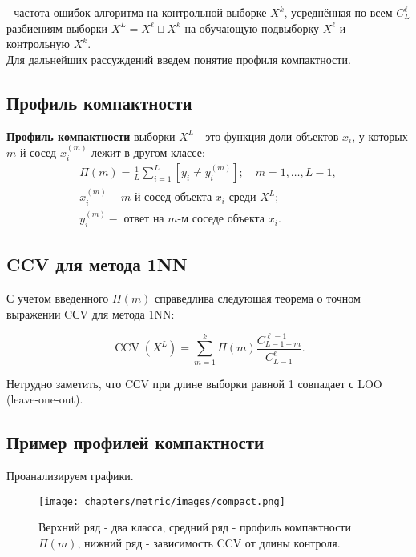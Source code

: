 \noindent
- частота ошибок алгоритма на контрольной выборке $X^k$, усреднённая по всем $C_L^{\ell}$ разбиениям выборки $X^L=X^{\ell} \sqcup X^k$ на обучающую подвыборку $X^{\ell}$ и контрольную $X^k$. \\

\noindent
Для дальнейших рассуждений введем понятие профиля компактности.


\subsection{Профиль компактности}

\noindent
\textbf{Профиль компактности} выборки $X^L$ - это функция доли объектов $x_i$, у которых $m$-й сосед $x_i^{(m)}$ лежит в другом классе: $$ \begin{gathered} \Pi(m)=\frac{1}{L} \sum_{i=1}^L\left[y_i \neq y_i^{(m)}\right] ; \quad m=1, \ldots, L-1, \\ x_i^{(m)}-m \text {-й сосед объекта } x_i \text { среди } X^L ; \\ y_i^{(m)}-\text { ответ на } m \text {-м соседе объекта } x_i . \end{gathered} $$


\subsection{CCV для метода 1NN}

\noindent
С учетом введенного $\Pi(m)$ справедлива следующая теорема о точном выражении CСV для метода 1NN:

\begin{equation*}
	\operatorname{CCV}\left(X^L\right)=\sum_{m=1}^k \Pi(m) \frac{C_{L-1-m}^{\ell-1}}{C_{L-1}^{\ell}} .
\end{equation*}

\noindent
Нетрудно заметить, что CСV при длине выборки равной 1 совпадает с LOO (leave-one-out).


\subsection{Пример профилей компактности}

\noindent
Проанализируем графики.

\begin{figure}[ht]
	\centering
	\texttt{[image: chapters/metric/images/compact.png]}
	\label{fig:compact}
	\caption{
		Верхний ряд - два класса, средний ряд - профиль компактности $\Pi(m)$, нижний ряд - зависимость CCV от длины контроля.
	}
\end{figure}

